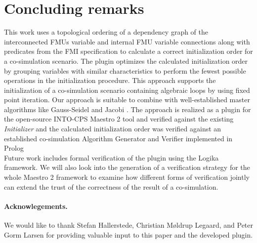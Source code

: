 \section{Concluding remarks}\label{sc:summary}
This work uses a topological ordering of a dependency graph of the interconnected FMUs variable and internal FMU variable connections along with predicates from the FMI specification to calculate a correct initialization order for a co-simulation scenario. 
The plugin optimizes the calculated initialization order by grouping variables with similar characteristics to perform the fewest possible operations in the initialization procedure.
This approach supports the initialization of a co-simulation scenario containing algebraic loops by using fixed point iteration. 
Our approach is suitable to combine with well-established master algorithms like Gauss-Seidel and Jacobi \cite{Palensky2017}. 
The approach is realized as a plugin for the open-source INTO-CPS Maestro 2 tool and verified against the existing \textit{Initializer} and the calculated initialization order was verified against an established co-simulation Algorithm Generator and Verifier implemented in Prolog\cite{gomes_lucio_vangheluwe_2019}\\
Future work includes formal verification of the plugin using the Logika framework\cite{inbook}.
We will also look into the generation of a verification strategy for the whole Maestro 2 framework to examine how different forms of verification jointly can extend the trust of the correctness of the result of a co-simulation. 

\paragraph*{\textbf{Acknowlegements.}}We would like to thank Stefan Hallerstede, Christian Møldrup Legaard, and Peter Gorm Larsen for providing valuable input to this paper and the developed plugin.